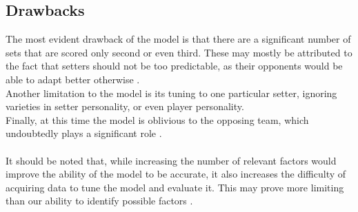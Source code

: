 \documentclass[main.tex]{subfiles}
\begin{document}
      \subsection{Drawbacks}
        
        The most evident drawback of the model is that there are a significant number of sets that are scored only second or even third. These may mostly be attributed to the fact that setters should not be too predictable, as their opponents would be able to adapt better otherwise \cite{gameTheory}. \\
        Another limitation to the model is its tuning to one particular setter, ignoring varieties in setter personality, or even player personality.\\
        Finally, at this time the model is oblivious to the opposing team, which undoubtedly plays a significant role \cite{gameTheory}.
        \\\\
        It should be noted that, while increasing the number of relevant factors would improve the ability of the model to be accurate, it also increases the difficulty of acquiring data to tune the model and evaluate it. This may prove more limiting than our ability to identify possible factors \cite[chapter 4.4]{PrinciplesOfMathematicalModeling}.
\end{document}
